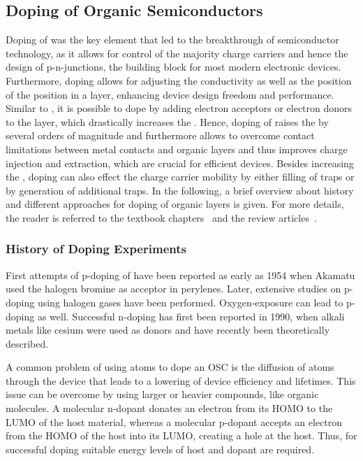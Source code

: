 \subsection{Doping of Organic Semiconductors}\label{sec:TheoDopingOrg}
Doping of \CSCs was the key element that led to the breakthrough of semiconductor technology, as it allows for control of the majority charge carriers and hence the design of p-n-junctions, the building block for most modern electronic devices. Furthermore, doping allows for adjusting the conductivity as well as the position of the \EfLong position in a layer, enhancing device design freedom and performance.
Similar to \CSCs, it is possible to dope \OSCs by adding electron acceptors or electron donors to the layer, which drastically increases the \nLong.
Hence, doping of \OSCs raises the \cLong by several orders of magnitude and furthermore allows to overcome contact limitations between metal contacts and organic layers and thus improves charge injection and extraction, which are crucial for efficient devices. Besides increasing the \nLong, doping can also effect the charge carrier mobility by either filling of traps or by generation of additional traps\cite{Schmechel2004,Arkhipov2005}.
In the following, a brief overview about history and different approaches for doping of organic layers is given. For more details, the reader is referred to the textbook chapters~\cite{RiedeLuessemLeo2011,LuessemRiedeLeo2012,HummertLeo2013} and the review articles~\cite{Walzer2007,LuessemRiedeLeo2013-PSS}.

\subsubsection{History of Doping Experiments}
First attempts of p-doping of \OSCs have been reported as early as 1954 when Akamatu\etal\cite{Akamatu1954} used the halogen bromine as acceptor in perylenes. Later, extensive studies on p-doping using halogen gases have been performed\cite{Curry1962,Yamamoto1979}. 
Oxygen-exposure can lead to p-doping as well\cite{Vaterlein1996,Hamed1993}.
Successful n-doping has first been reported\cite{Ramsey1990,Haddon1991} in 1990, when alkali metals like cesium %
were used as donors and have recently been theoretically described\cite{Mityashin2012}.

A common problem of using atoms to dope an OSC is the diffusion of atoms through the device that leads to a lowering of device efficiency and lifetimes\cite{Walzer2007}. This issue can be overcome by using larger or heavier compounds, like organic molecules. A molecular n-dopant donates an electron from its HOMO to the LUMO of the host material, whereas a molecular p-dopant accepts an electron from the HOMO of the host into its LUMO, creating a hole at the host. Thus, for successful doping suitable energy levels of host and dopant are required. 

